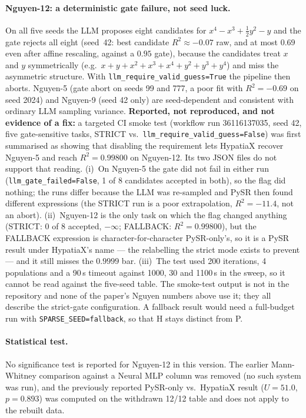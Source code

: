 \documentclass[twoside,11pt]{article}
\newcommand{\Rsq}{R^{2}}
\begin{document}
\paragraph{Nguyen-12: a deterministic gate failure, not seed luck.} On all five
seeds the LLM proposes eight candidates for $x^4-x^3+\tfrac12y^2-y$ and the gate
rejects all eight (seed~42: best candidate $\Rsq\approx-0.07$ raw, and at most $0.69$ even after affine rescaling, against a $0.95$ gate), because the
candidates treat $x$ and $y$ symmetrically (e.g.\ $x+y+x^2+x^3+x^4+y^2+y^3+y^4$)
and miss the asymmetric structure. With \texttt{llm\_require\_valid\_guess=True}
the pipeline then aborts. Nguyen-5 (gate abort on seeds 99 and 777, a poor fit
with $\Rsq=-0.69$ on seed 2024) and Nguyen-9 (seed 42 only) are seed-dependent
and consistent with ordinary LLM sampling variance. \textbf{Reported, not reproduced, and not evidence of a fix:} a
targeted CI smoke test (workflow run 36116137035, seed 42, five gate-sensitive tasks,
STRICT vs.\ \texttt{llm\_require\_valid\_guess=False}) was first summarised as showing that
disabling the requirement lets HypatiaX recover Nguyen-5 and reach $\Rsq=0.99800$ on
Nguyen-12. Its two JSON files do not support that reading.
(i)~On Nguyen-5 the gate did not fail in either run (\texttt{llm\_gate\_failed=False}, 1 of 8
candidates accepted in both), so the flag did nothing; the runs differ because the LLM was
re-sampled and PySR then found different expressions (the STRICT run is a poor extrapolation,
$\Rsq=-11.4$, not an abort).
(ii)~Nguyen-12 is the only task on which the flag changed anything (STRICT: 0 of 8 accepted,
$-\infty$; FALLBACK: $\Rsq=0.99800$), but the FALLBACK expression is character-for-character
PySR-only's, so it is a PySR result under HypatiaX's name --- the relabelling the strict
mode exists to prevent --- and it still misses the $0.9999$ bar.
(iii)~The test used 200 iterations, 4 populations and a 90\,s timeout against 1000, 30 and
1100\,s in the sweep, so it cannot be read against the five-seed table.
The smoke-test output is not in the repository and none of the paper's Nguyen numbers above
use it; they all describe the strict-gate configuration. A fallback result would need a
full-budget run with \texttt{SPARSE\_SEED=fallback}, so that H stays distinct from P.


\paragraph{Statistical test.} No significance test is reported for Nguyen-12 in this
version. The earlier Mann-Whitney comparison against a Neural MLP column was
removed (no such system was run), and the previously reported PySR-only vs.\
HypatiaX result ($U=51.0$, $p=0.893$) was computed on the withdrawn 12/12
table and does not apply to the rebuilt data.
\end{document}
